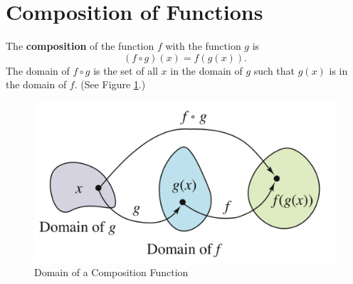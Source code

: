 \section{Composition of Functions}

\begin{definition} 
    The \textbf{composition} of the function $f$ with the function $g$ is
    $$(f\circ g)(x)=f(g(x)).$$
    The domain of $f\circ g$ is the set of all $x$ in the domain of $g$ such that $g(x)$ is in the domain of $f$. (See Figure \ref{fig:domain_comp}.)
    \\\cite{ci}
\end{definition}

\begin{figure}[h]
\centering
\includegraphics[scale=0.5]{img/fig/domain_comp.png}
\caption{Domain of a Composition Function \cite{ci}}
\label{fig:domain_comp}
\end{figure}

